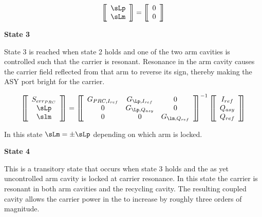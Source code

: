 \documentclass[12pt]{article}
\newcommand{\tit}[1]{\begin{center}\textbf{\Huge{#1}}\end{center}\vspace{1ex}}
\begin{document}
\begin{equation*}
\matrixBegin{c}
 \sLp \\
 \sLm \\
\matrixEnd
 =
\matrixBegin{c}
 0 \\
 0 \\
\matrixEnd
\end{equation*}

\newpage
\tit{State 3}



State 3 is reached when state 2 holds and one of the two arm cavities
 is controlled such that the carrier is resonant.
Resonance in the arm cavity causes the carrier field
 reflected from that arm to reverse its sign,
 thereby making the ASY port bright for the carrier.

\begin{equation*}
\matrixBegin{c}
 \slp \\
 \sLp \\
 \slm \\
\matrixEnd
 =
\matrixBegin{ccc}
 G_{\lp, I_{ref}} & G_{\Lp, I_{ref}} & 0 \\
 0                & G_{\Lp, Q_{asy}} & 0 \\
 0                & 0 & G_{\lm, Q_{ref}} \\
\matrixEnd^{-1}
\matrixBegin{c}
 I_{ref} \\
 Q_{asy} \\
 Q_{ref} \\
\matrixEnd
\end{equation*}

In this state $\sLm = \pm \sLp$ depending on which arm is locked.

\newpage
\tit{State 4}



This is a transitory state that occurs when state 3 holds and
 the as yet uncontrolled arm cavity is locked at carrier resonance.
In this state the carrier is resonant in both arm cavities and the
 recycling cavity.
The resulting coupled
 cavity allows the carrier power in the \ifo{} to increase
 by roughly three orders of magnitude.
\end{document}
